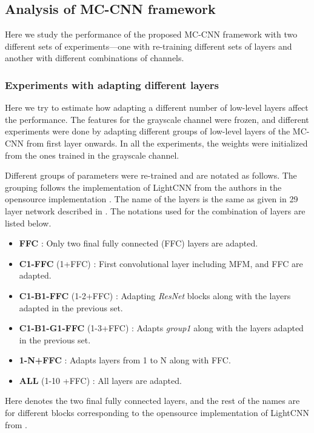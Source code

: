 \documentclass[journal]{IEEEtran}
\begin{document}
\subsection{Analysis of MC-CNN framework}
Here we study the performance of the proposed MC-CNN framework with two different sets of experiments---one with re-training different sets of layers and another with different combinations of channels.

\subsubsection{Experiments with adapting different layers}

Here we try to estimate how adapting a different number of low-level layers affect the performance. The features for the grayscale channel were frozen, and different experiments were done by adapting different groups of low-level layers of the MC-CNN from first layer onwards. In all the experiments, the weights were initialized from the ones trained in the grayscale channel.

Different groups of parameters were re-trained and are notated as follows. The grouping follows the implementation of LightCNN from the authors in the opensource implementation \cite{LightCNN}. The name of the layers is the same as given in 29 layer network described in \cite{wu2018light}.
The notations used for the combination of layers are listed below.
\begin{itemize}
  \item \textbf{FFC} : Only two final fully connected (FFC) layers are adapted.
  \item \textbf{C1-FFC} (1+FFC) : First convolutional layer including MFM, and FFC are adapted.\item \textbf{C1-B1-FFC} (1-2+FFC) : Adapting \textit{ResNet} blocks along with the layers adapted in the previous set.
  \item \textbf{C1-B1-G1-FFC} (1-3+FFC) : Adapts \textit{group1} along with the layers adapted in the previous set.
  \item \textbf{1-N+FFC} : Adapts layers from 1 to N along with FFC. 
  \item \textbf{ALL} (1-10 +FFC) : All layers are adapted.
\end{itemize}
Here  denotes the two final fully connected layers, and the rest of the names are for different blocks
corresponding to the opensource implementation of LightCNN from \cite{wu2018light}.
\end{document}
